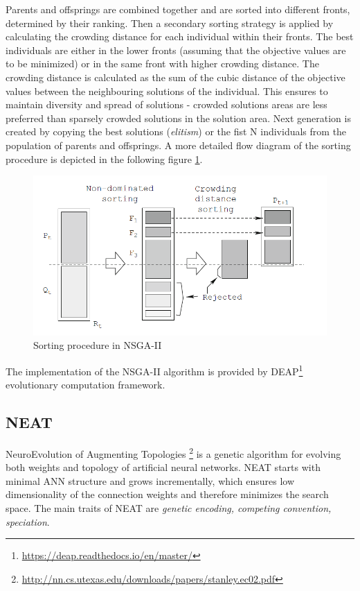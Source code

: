 \documentclass[format=acmsmall, review=false, screen=true]{acmart}
\begin{document}
Parents and offsprings are combined together and are sorted into different fronts, determined by their ranking. Then a secondary sorting strategy is applied by calculating the crowding distance for each individual within their fronts. The best individuals are either in the lower fronts (assuming that the objective values are to be minimized) or in the same front with higher crowding distance. The crowding distance is calculated as the sum of the cubic distance of the objective values between the neighbouring solutions of the individual. This ensures to maintain diversity and spread of solutions - crowded solutions areas are less preferred than sparsely crowded solutions in the solution area. Next generation is created by copying the best solutions (\emph{elitism}) or the fist N individuals from the population of parents and offsprings. A more detailed flow diagram of the sorting procedure is depicted in the following figure \ref{fig:nsga}.

\begin{figure}[H]
  \includegraphics[width=0.66\linewidth]{img/nsga.PNG}
  \caption{\label{fig:nsga}Sorting procedure in NSGA-II}
\end{figure}

The implementation of the NSGA-II algorithm is provided by DEAP\footnote{\url{https://deap.readthedocs.io/en/master/}} evolutionary computation framework.

\subsection{NEAT}

NeuroEvolution of Augmenting Topologies \footnote{\url{http://nn.cs.utexas.edu/downloads/papers/stanley.ec02.pdf}} is a genetic algorithm for evolving both weights and topology of artificial neural networks. NEAT starts with minimal ANN structure and grows incrementally, which ensures low dimensionality of the connection weights and therefore minimizes the search space. The main traits of NEAT are \emph{genetic encoding, competing convention, speciation}.
\end{document}
